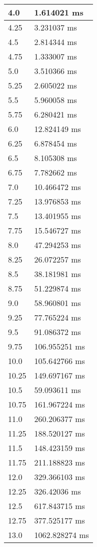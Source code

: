\begin{multicols}{2}
\begin{tabular}{|l|l|}
		4.0 & 1.614021 ms \\ \hline
		4.25 & 3.231037 ms \\ \hline
		4.5 & 2.814344 ms \\ \hline
		4.75 & 1.333007 ms \\ \hline
		5.0 & 3.510366 ms \\ \hline
		5.25 & 2.605022 ms \\ \hline
		5.5 & 5.960058 ms \\ \hline
		5.75 & 6.280421 ms \\ \hline
		6.0 & 12.824149 ms \\ \hline
		6.25 & 6.878454 ms \\ \hline
		6.5 & 8.105308 ms \\ \hline
		6.75 & 7.782662 ms \\ \hline
		7.0 & 10.466472 ms \\ \hline
		7.25 & 13.976853 ms \\ \hline
		7.5 & 13.401955 ms \\ \hline
		7.75 & 15.546727 ms \\ \hline
		8.0 & 47.294253 ms \\ \hline
		8.25 & 26.072257 ms \\ \hline
		8.5 & 38.181981 ms \\ \hline
		8.75 & 51.229874 ms \\ \hline
		9.0 & 58.960801 ms \\ \hline
		9.25 & 77.765224 ms \\ \hline
		9.5 & 91.086372 ms \\ \hline
		9.75 & 106.955251 ms \\ \hline
		10.0 & 105.642766 ms \\ \hline
		10.25 & 149.697167 ms \\ \hline
		10.5 & 59.093611 ms \\ \hline
		10.75 & 161.967224 ms \\ \hline
		11.0 & 260.206377 ms \\ \hline
		11.25 & 188.520127 ms \\ \hline
		11.5 & 148.423159 ms \\ \hline
		11.75 & 211.188823 ms \\ \hline
		12.0 & 329.366103 ms \\ \hline
		12.25 & 326.42036 ms \\ \hline
		12.5 & 617.843715 ms \\ \hline
		12.75 & 377.525177 ms \\ \hline
		13.0 & 1062.828274 ms \\ \hline

\end{tabular}
\end{multicols}
